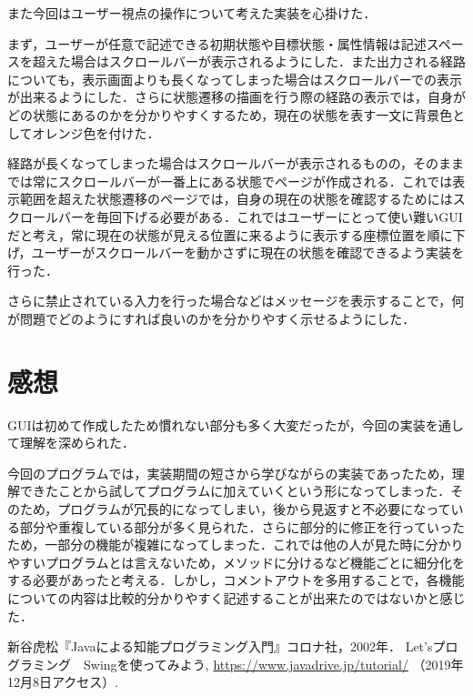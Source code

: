 \documentclass[12pt]{jarticle}
\begin{document}
また今回はユーザー視点の操作について考えた実装を心掛けた．\par
まず，ユーザーが任意で記述できる初期状態や目標状態・属性情報は記述スペースを超えた場合はスクロールバーが表示されるようにした．また出力される経路についても，表示画面よりも長くなってしまった場合はスクロールバーでの表示が出来るようにした．さらに状態遷移の描画を行う際の経路の表示では，自身がどの状態にあるのかを分かりやすくするため，現在の状態を表す一文に背景色としてオレンジ色を付けた．\par
経路が長くなってしまった場合はスクロールバーが表示されるものの，そのままでは常にスクロールバーが一番上にある状態でページが作成される．これでは表示範囲を超えた状態遷移のページでは，自身の現在の状態を確認するためにはスクロールバーを毎回下げる必要がある．これではユーザーにとって使い難いGUIだと考え，常に現在の状態が見える位置に来るように表示する座標位置を順に下げ，ユーザーがスクロールバーを動かさずに現在の状態を確認できるよう実装を行った．\par
さらに禁止されている入力を行った場合などはメッセージを表示することで，何が問題でどのようにすれば良いのかを分かりやすく示せるようにした．

\section{感想}
GUIは初めて作成したため慣れない部分も多く大変だったが，今回の実装を通して理解を深められた．\par
今回のプログラムでは，実装期間の短さから学びながらの実装であったため，理解できたことから試してプログラムに加えていくという形になってしまった．そのため，プログラムが冗長的になってしまい，後から見返すと不必要になっている部分や重複している部分が多く見られた．さらに部分的に修正を行っていったため，一部分の機能が複雑になってしまった．これでは他の人が見た時に分かりやすいプログラムとは言えないため，メソッドに分けるなど機能ごとに細分化をする必要があったと考える．しかし，コメントアウトを多用することで，各機能についての内容は比較的分かりやすく記述することが出来たのではないかと感じた．

\begin{thebibliography}{99}
 新谷虎松『Javaによる知能プログラミング入門』コロナ社，2002年．
 Let'sプログラミング　Swingを使ってみよう, \url{https://www.javadrive.jp/tutorial/} （2019年12月8日アクセス）.
\end{thebibliography}
\end{document}
